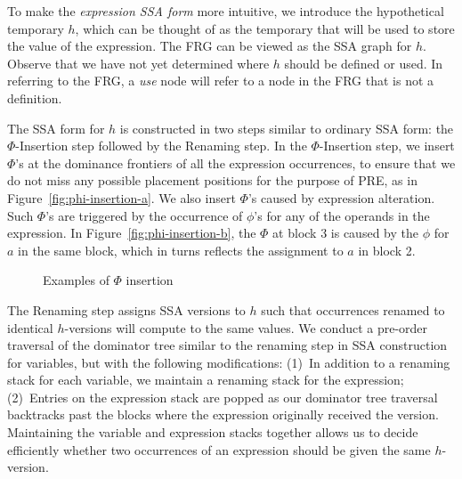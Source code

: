 To make the \emph{expression SSA form} more intuitive, we introduce the hypothetical temporary $h$, which can be thought of as the temporary that will be used to store the value of the expression.
The FRG can be viewed as the SSA graph for $h$.
Observe that we have not yet determined where $h$ should be defined or used. 
In referring to the FRG, a \emph{use} node will refer to a node in the FRG that is not a definition.

The SSA form for $h$ is constructed in two steps similar to ordinary SSA form: 
the $\Phi$-Insertion step followed by the Renaming step. 
In the $\Phi$-Insertion step, we insert $\Phi$'s at the dominance frontiers of all the expression occurrences, to ensure that we do not miss any possible placement positions for the purpose of PRE, as in Figure~\ref{fig:phi-insertion-a}. 
We also insert $\Phi$'s caused by expression alteration. 
Such $\Phi$'s are triggered by the occurrence of $\phi$'s for any of the operands in the expression. 
In Figure~\ref{fig:phi-insertion-b}, the $\Phi$ at block 3 is caused by the $\phi$ for $a$ in the same block, which in turns reflects the assignment to $a$ in block 2.

\begin{figure}
\centering
\caption{Examples of $\Phi$ insertion}
\label{fig:phi-insertion}
\end{figure}

The Renaming step assigns SSA versions to $h$ such that occurrences renamed to identical $h$-versions will compute to the same values. 
We conduct a pre-order traversal of the dominator tree similar to the renaming step in SSA construction for variables, but with the following modifications: 
(1)~In addition to a renaming stack for each variable, we maintain a renaming stack for the expression; 
(2)~Entries on the expression stack are popped as our dominator tree traversal backtracks past the blocks where the expression originally received the version. 
Maintaining the variable and expression stacks together allows us to decide efficiently whether two occurrences of an expression should be given the same $h$-version.

